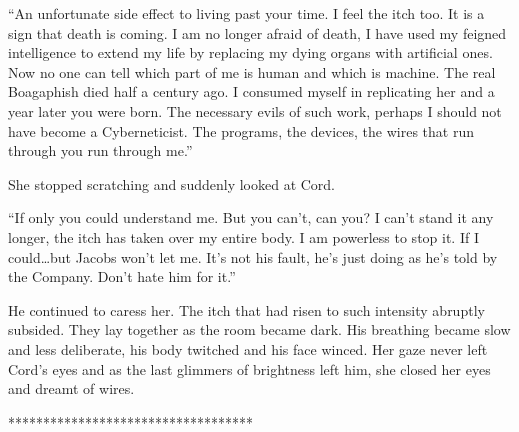 \documentclass[
]{article}
\begin{document}
``An unfortunate side effect to living past your time. I feel the itch
too. It is a sign that death is coming. I am no longer afraid of death,
I have used my feigned intelligence to extend my life by replacing my
dying organs with artificial ones. Now no one can tell which part of me
is human and which is machine. The real Boagaphish died half a century
ago. I consumed myself in replicating her and a year later you were
born. The necessary evils of such work, perhaps I should not have become
a Cyberneticist. The programs, the devices, the wires that run through
you run through me.''

She stopped scratching and suddenly looked at Cord.

``If only you could understand me. But you can't, can you? I can't stand
it any longer, the itch has taken over my entire body. I am powerless to
stop it. If I could\ldots but Jacobs won't let me. It's not his fault,
he's just doing as he's told by the Company. Don't hate him for it.''

He continued to caress her. The itch that had risen to such intensity
abruptly subsided. They lay together as the room became dark. His
breathing became slow and less deliberate, his body twitched and his
face winced. Her gaze never left Cord's eyes and as the last glimmers of
brightness left him, she closed her eyes and dreamt of wires.

***********************************
\end{document}

